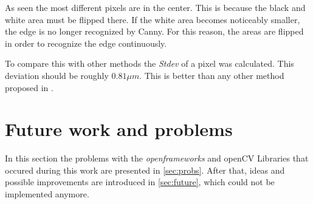 \documentclass[journal,final,a4paper,twoside]{PS}
\begin{document}
As seen the most different pixels are in the center. This is because the black and white area must be flipped there. If the white area becomes noticeably smaller, the edge is no longer recognized by Canny. For this reason, the areas are flipped in order to recognize the edge continuously. 

To compare this with other methods the \emph{Stdev} of a pixel was calculated. This deviation should be roughly $0.81\mu m$. This is better than any other method proposed in \cite{Salvi}.

\section{Future work and problems}
\label{sec:work_probs}
In this section the problems with the \emph{openframeworks} and openCV Libraries that occured during this work are presented in \ref{sec:probs}. After that, ideas and possible improvements are introduced in \ref{sec:future}, which could not be implemented anymore.
\end{document}
